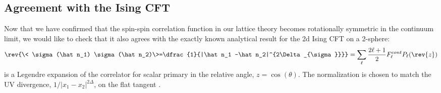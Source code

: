 %

\subsection{Agreement with the Ising CFT}
\label{sec:CFTtest}

Now that we have confirmed that the spin-spin correlation function in our lattice theory becomes rotationally symmetric in the continuum limit, we would like to check that it also agrees with the exactly known analytical result for the 2d Ising CFT on a 2-sphere:
\begin{equation}
\label{eq:CFT_sphere_2pt}
\rev{\< \sigma(\hat n_1)  \sigma(\hat n_2)\>=\dfrac{1}{|\hat n_1 -\hat n_2|^{2\Delta_{\sigma}}}} = \sum_{\ell} \dfrac{2 \ell + 1}{2} F^{cont}_{\ell} P_{\ell} ( \rev{z})
\end{equation}
is a Legendre expansion of the correlator
for scalar primary   in the relative angle, $ z= \cos( \theta)$. The normalization is chosen to match the UV
divergence, $1/|x_1 - x_2|^{2 \Delta}$, on the flat tangent .

